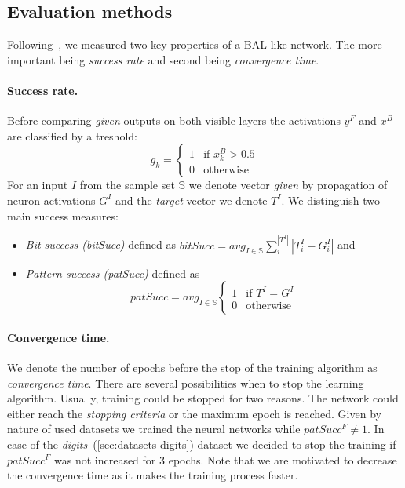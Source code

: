 
\subsection{Evaluation methods} 
\label{sec:sim-evaluation} 

Following~\citet{farkas2013bal}, we measured two key properties of a BAL-like network. The more important being \emph{success rate} and second being \emph{convergence time}. 

\paragraph{Success rate.}  
Before comparing \emph{given} outputs on both visible layers the activations $y^F$ and $x^B$ are classified by a treshold: 
\begin{equation} 
  g_k =
  \left\{
	  \begin{array}{ll}
		  1 & \mbox{if } x_k^B > 0.5 \\
		  0 & \mbox{otherwise}
	  \end{array}
  \right.  
\end{equation} 
For an input $I$ from the sample set $\mathbb{S}$ we denote vector \emph{given} by propagation of neuron activations $G^I$ and the \emph{target} vector we denote $T^I$. We distinguish two main success measures: 

\begin{itemize}
  \item \emph{Bit success (bitSucc)} defined as $bitSucc = avg_{I \in \mathbb{S}} \sum_i^{|T^I|} |T_i^I - G^I_i|$ and 
  \item \emph{Pattern success (patSucc)} defined as 
    \begin{equation}
      patSucc = avg_{I \in \mathbb{S}} \left\{
	      \begin{array}{ll}
		      1 & \mbox{if } T^I = G^I \\
		      0 & \mbox{otherwise}
	      \end{array}
      \right.
    \end{equation} 
\end{itemize} 

\paragraph{Convergence time.} We denote the number of epochs before the stop of the training algorithm as \emph{convergence time}. There are several possibilities when to stop the learning algorithm. Usually, training could be stopped for two reasons. The network could either reach the \emph{stopping criteria} or the maximum epoch is reached. Given by nature of used datasets we trained the neural networks while $patSucc^F \neq 1$. In case of the \emph{digits}~(\ref{sec:datasets-digits}) dataset we decided to stop the training if $patSucc^F$ was not increased for 3 epochs. Note that we are motivated to decrease the convergence time as it makes the training process faster.  

